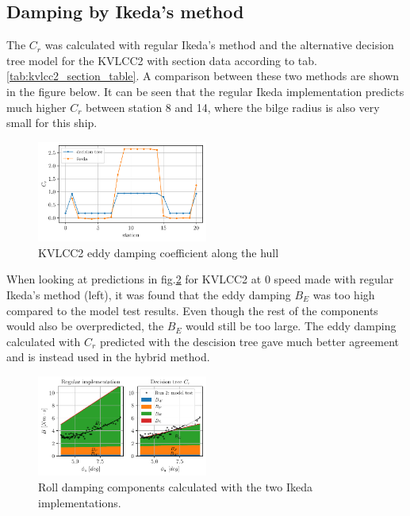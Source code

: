     
\subsection*{Damping by Ikeda's method}\label{ikedas-method}

    The $C_r$ was calculated with regular Ikeda's method and the
alternative decision tree model for the KVLCC2 with section data
according to tab.\ref{tab:kvlcc2_section_table}. A comparison
between these two methods are shown in the figure below. It can be seen
that the regular Ikeda implementation predicts much higher $C_r$
between station 8 and 14, where the bilge radius is also very small for
this ship.

    \begin{figure}[H]
        \begin{center}\includegraphics[width = 0.5\textwidth]{figures/kvlcc2_eddy.pdf}\end{center}
        \vspace{-1cm}
        \caption{KVLCC2 eddy damping coefficient along the hull}
        \label{fig:kvlcc2_eddy}
    \end{figure}
    
    When looking at predictions in fig.\ref{fig:ikeda} for KVLCC2 at
0 speed made with regular Ikeda's method (left), it was found that the
eddy damping $B_E$ was too high compared to the model test results.
Even though the rest of the components would also be overpredicted, the
$B_E$ would still be too large. The eddy damping calculated with
$C_r$ predicted with the descision tree gave much better agreement and
is instead used in the hybrid method.

    

    \begin{figure}[H]
        \begin{center}\includegraphics[width = 0.5\textwidth]{figures/ikeda.pdf}\end{center}
        \vspace{-1cm}
        \caption{Roll damping components calculated with the two Ikeda implementations.}
        \label{fig:ikeda}
    \end{figure}
    
